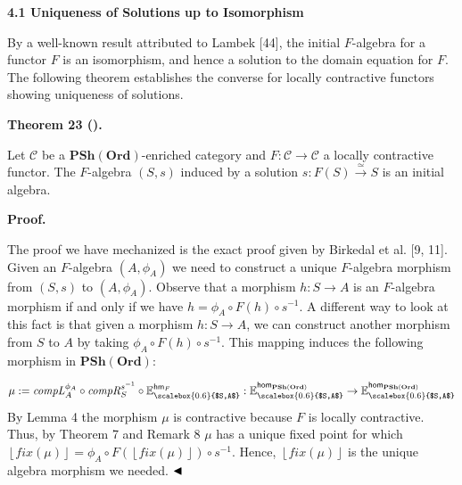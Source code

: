  
 
\par\medskip\noindent\textbf{4.1 Uniqueness of Solutions up to Isomorphism}\par
 
 
By a well-known result attributed to Lambek [44], the initial $F$-algebra for a functor $F$ is an isomorphism, and hence a solution to the domain equation for $F$. The following theorem establishes the converse for locally contractive functors showing uniqueness of solutions.\par
 
 
 
\par\medskip\noindent\textbf{Theorem 23 ().}\par
 
 
Let $\mathcal{C}$ be a $\mathbf{PSh}(\mathbf{Ord})$-enriched category and $F:\mathcal{C}\to\mathcal{C}$ a locally contractive functor. The $F$-algebra $(S,s)$ induced by a solution $s:F(S)\xrightarrow{\simeq}S$ is an initial algebra.\par
 
 
 
 
\par\medskip\noindent\textbf{Proof.}\par
 
 
The proof we have mechanized is the exact proof given by Birkedal et al. [9, 11]. Given an $F$-algebra $(A,\phi_{A})$ we need to construct a unique $F$-algebra morphism from $(S,s)$ to $(A,\phi_{A})$. Observe that a morphism $h:S\to A$ is an $F$-algebra morphism if and only if we have $h=\phi_{A}\circ F(h)\circ s^{-1}$. A different way to look at this fact is that given a morphism $h:S\to A$, we can construct another morphism from $S$ to $A$ by taking $\phi_{A}\circ F(h)\circ s^{-1}$. This mapping induces the following morphism in $\mathbf{PSh}(\mathbf{Ord})$:\par
    \[\mu:=\mathit{compL}^{\phi_{A}}_{A}\circ\mathit{compR}^{s^{-1}}_{S}\circ\mathbb{E}^{\mathsf{hm}_{F}}_{\scalebox{0.6}{$S,A$}}:\mathbb{E}^{\mathsf{hom}_{\mathbf{PSh}(\mathbf{Ord})}}_{\scalebox{0.6}{$S,A$}}\to\mathbb{E}^{\mathsf{hom}_{\mathbf{PSh}(\mathbf{Ord})}}_{\scalebox{0.6}{$S,A$}}\]    
By Lemma 4 the morphism $\mu$ is contractive because $F$ is locally contractive. Thus, by Theorem 7 and Remark 8 $\mu$ has a unique fixed point for which $\left\lfloor{\mathit{fix}(\mu)}\right\rfloor=\phi_{A}\circ F(\left\lfloor{\mathit{fix}(\mu)}\right\rfloor)\circ s^{-1}$. Hence, $\left\lfloor{\mathit{fix}(\mu)}\right\rfloor$ is the unique algebra morphism we needed. $\hfill\blacktriangleleft$\par
 
